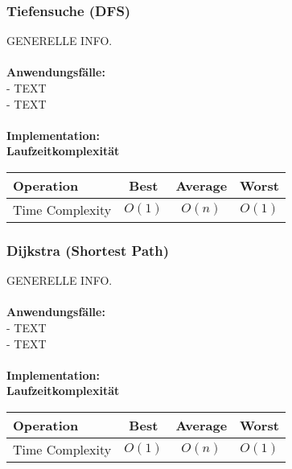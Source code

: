 \documentclass[../main.tex]{subfiles}
\begin{document}
	\subsubsection{Tiefensuche (DFS)}
	GENERELLE INFO. \\\\
	\textbf{Anwendungsfälle:}\\
	- TEXT\\
	- TEXT\\\\
	\textbf{Implementation:}\\
	 
	\textbf{Laufzeitkomplexität}\\
	\begin{table}[ht]
		\centering
		\begin{tabular}{l *{3}{c}}
			\toprule
			Operation & Best & Average & Worst\\
			\midrule
			Time Complexity & $O(1)$ & $O(n)$ & $O(1)$\\
			\bottomrule
		\end{tabular}
	\end{table}
	\clearpage
	
	\subsubsection{Dijkstra (Shortest Path)}
	GENERELLE INFO. \\\\
	\textbf{Anwendungsfälle:}\\
	- TEXT\\
	- TEXT\\\\
	\textbf{Implementation:}\\
	 
	\textbf{Laufzeitkomplexität}\\
	\begin{table}[ht]
		\centering
		\begin{tabular}{l *{3}{c}}
			\toprule
			Operation & Best & Average & Worst\\
			\midrule
			Time Complexity & $O(1)$ & $O(n)$ & $O(1)$\\
			\bottomrule
		\end{tabular}
	\end{table}
	\clearpage
	
\end{document}
